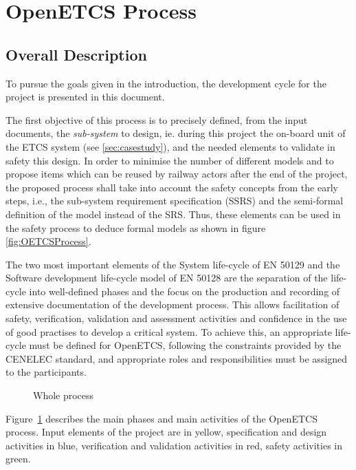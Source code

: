 
\section{OpenETCS Process}


\subsection{Overall Description}
\label{sec:overall_description}


To pursue the goals given in the introduction, the development cycle for the project is presented in this document.

The first objective of this process is to precisely defined, from the input documents, the \emph{sub-system} to design, ie. during this project the on-board unit of the ETCS system (see \ref{sec:casestudy}), and the needed elements to validate in safety this design.
In order to minimise the number of different models and to propose items which can be reused by railway actors after the end of the project, the proposed process shall take into account the safety concepts from the early steps, i.e., the sub-system requirement specification (SSRS) and the semi-formal definition of the model instead of the SRS. Thus, these elements can be used in the safety process to deduce formal models as shown in figure \ref{fig:OETCSProcess}.

The two most important elements of the System life-cycle of EN 50129 and the Software development life-cycle model of EN
50128 are the separation of the life-cycle into well-defined
phases and the focus on the production and recording of extensive documentation of the
development process. This allows facilitation of safety, verification, validation and assessment activities and confidence in the use of good practises to develop a critical system. To achieve this, an appropriate life-cycle
must be defined for OpenETCS, following the constraints provided by the CENELEC standard, and appropriate roles and responsibilities must be assigned to the participants.

 \begin{figure}
  \centering
  \caption{Whole process}
  \label{fig:whole_process}
\end{figure}

Figure~\ref{fig:whole_process} describes the main phases and main activities of the OpenETCS process.
Input elements of the project are in yellow, specification and design activities in blue, verification and validation activities in red, safety activities in green.

